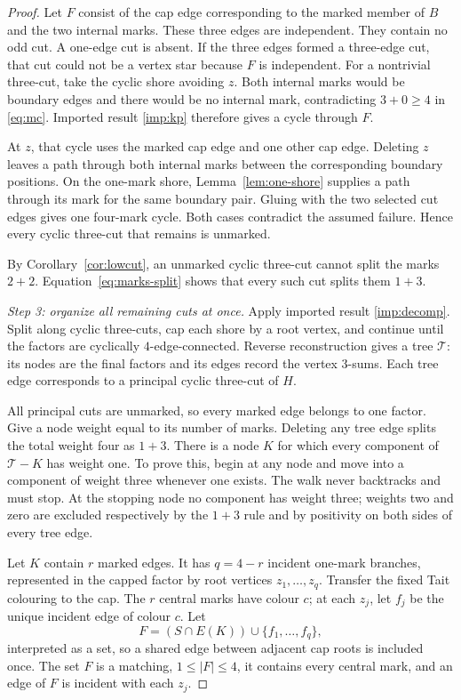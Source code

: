 \documentclass[11pt]{article}
\theoremstyle{definition}
\theoremstyle{remark}
\begin{document}
\begin{proof}
Let \(F\) consist of the cap edge corresponding to the marked member of
\(B\) and the two internal marks.  These three edges are independent.
They contain no odd cut.  A one-edge cut is absent.  If the three edges
formed a three-edge cut, that cut could not be a vertex star because
\(F\) is independent.  For a nontrivial three-cut, take the cyclic
shore avoiding \(z\).  Both internal marks would be boundary edges and
there would be no internal mark, contradicting \(3+0\geq4\) in
\eqref{eq:mc}.  Imported result \ref{imp:kp} therefore gives a cycle
through \(F\).

At \(z\), that cycle uses the marked cap edge and one other cap edge.
Deleting \(z\) leaves a path through both internal marks between the
corresponding boundary positions.  On the one-mark shore,
Lemma~\ref{lem:one-shore} supplies a path through its mark for the same
boundary pair.  Gluing with the two selected cut edges gives one
four-mark cycle.  Both cases contradict the assumed failure.  Hence
every cyclic three-cut that remains is unmarked.

By Corollary~\ref{cor:lowcut}, an unmarked cyclic three-cut cannot split
the marks \(2+2\).  Equation~\eqref{eq:marks-split} shows that every
such cut splits them \(1+3\).

\smallskip
\noindent\emph{Step 3: organize all remaining cuts at once.}
Apply imported result \ref{imp:decomp}.  Split along cyclic three-cuts,
cap each shore by a root vertex, and continue until the factors are
cyclically \(4\)-edge-connected.  Reverse reconstruction gives a tree
\(\mathcal T\): its nodes are the final factors and its edges record
the vertex 3-sums.  Each tree edge corresponds to a principal cyclic
three-cut of \(H\).

All principal cuts are unmarked, so every marked edge belongs to one
factor.  Give a node weight equal to its number of marks.  Deleting any
tree edge splits the total weight four as \(1+3\).  There is a node
\(K\) for which every component of \(\mathcal T-K\) has weight one.
To prove this, begin at any node and move into a component of weight
three whenever one exists.  The walk never backtracks and must stop.
At the stopping node no component has weight three; weights two and
zero are excluded respectively by the \(1+3\) rule and by positivity
on both sides of every tree edge.

Let \(K\) contain \(r\) marked edges.  It has
\(q=4-r\) incident one-mark branches, represented in the capped factor
by root vertices \(z_1,\ldots,z_q\).  Transfer the fixed Tait colouring
to the cap.  The \(r\) central marks have colour \(c\); at each \(z_j\),
let \(f_j\) be the unique incident edge of colour \(c\).  Let
\[
 F=(S\cap E(K))\cup\{f_1,\ldots,f_q\},
\]
interpreted as a set, so a shared edge between adjacent cap roots is
included once.  The set \(F\) is a matching, \(1\leq |F|\leq4\), it
contains every central mark, and an edge of \(F\) is incident with each
\(z_j\).


\end{proof}
\end{document}
